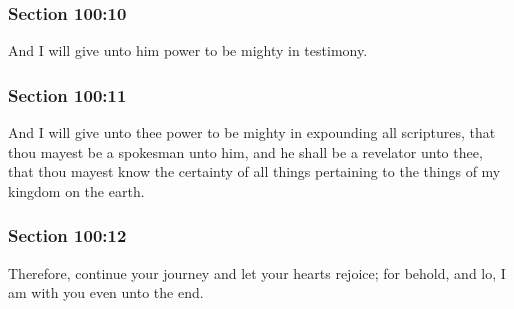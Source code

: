 	\subsubsection{Section 100:10} %
		\label{DC100-10}

		And I will give unto him power to be mighty in testimony.


	\subsubsection{Section 100:11} %
		\label{DC100-11}

		And I will give unto thee power to be mighty in expounding all scriptures, that thou mayest be a spokesman unto him, and he shall be a revelator unto thee, that thou mayest know the certainty of all things pertaining to the things of my kingdom on the earth.


	\subsubsection{Section 100:12} %
		\label{DC100-12}

		Therefore, continue your journey and let your hearts rejoice; for behold, and lo, I am with you even unto the end.


